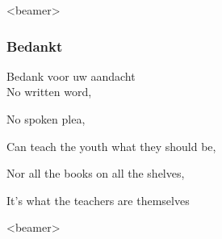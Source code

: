 \documentclass[english]{beamer}
\begin{document}

\begin{frame}<beamer> 
  \frametitle{Bedankt}
	  {\huge \color{ugentyellow} Bedank voor uw aandacht}\\
	  No written word,
	  
	  No spoken plea,
	  
	  Can teach the youth what they should be,
	  
	  Nor all the books on all the shelves,
	  
	  It's what the teachers are themselves 
\end{frame}

\begin{frame}<beamer> 
	\footnotesize{\tableofcontents[hidesubsections]}
\end{frame}
\end{document}
